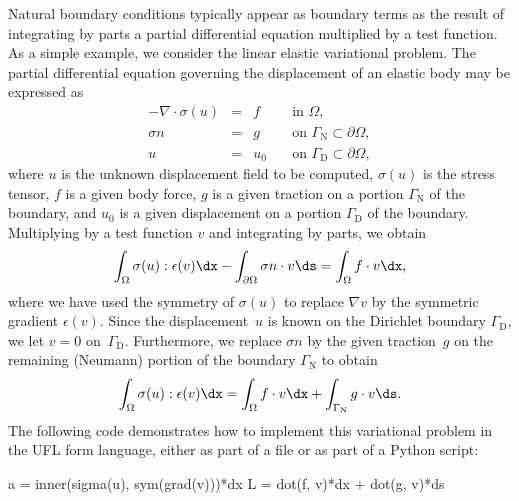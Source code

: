 Natural boundary conditions typically appear as boundary terms as the
result of integrating by parts a partial differential equation multiplied
by a test function. As a simple example, we consider the linear elastic
variational problem. The partial differential equation governing the
displacement of an elastic body may be expressed as
\begin{equation} \label{eq:logg-2:elasticity}
  \begin{array}{rcll}
    - \nabla \cdot \sigma(u) &=& f \quad &\mbox{in } \Omega,
    \\
    \sigma n &=& g \quad  &\mbox{on } \Gamma_{\mathrm{N}} \subset \partial\Omega,
    \\
    u &=& u_0 \quad  &\mbox{on } \Gamma_{\mathrm{D}} \subset \partial\Omega,
    \end{array}
\end{equation}
where $u$ is the unknown displacement field to be computed,
$\sigma(u)$ is the stress tensor, $f$ is a given body force, $g$ is a
given traction on a portion $\Gamma_{\mathrm{N}}$ of the boundary, and
$u_0$ is a given displacement on a portion $\Gamma_{\mathrm{D}}$ of
the boundary. Multiplying by a test function $v$ and integrating by
parts, we obtain
\begin{equation}
  \int_{\Omega} \sigma(u) : \epsilon(v) \dx - \int_{\partial\Omega}
  \sigma n \cdot v \ds = \int_{\Omega} f \cdot v \dx,
\end{equation}
where we have used the symmetry of $\sigma(u)$ to replace $\nabla v$
by the symmetric gradient $\epsilon(v)$. Since the displacement~$u$
is known on the Dirichlet boundary $\Gamma_{\mathrm{D}}$, we let $v =
0$ on~$\Gamma_{\mathrm{D}}$. Furthermore, we replace $\sigma n$ by the
given traction~$g$ on the remaining (Neumann) portion of the boundary
$\Gamma_{\mathrm{N}}$ to obtain
\begin{equation}
  \int_{\Omega} \sigma(u) : \epsilon(v) \dx
    = \int_{\Omega} f \cdot v \dx + \int_{\Gamma_{\mathrm{N}}} g \cdot v \ds.
\end{equation}
The following code demonstrates how to implement this variational
problem in the UFL form language, either as part of a  file
or as part of a Python script:
\begin{uflcode}
a = inner(sigma(u), sym(grad(v)))*dx
L = dot(f, v)*dx + dot(g, v)*ds
\end{uflcode}


